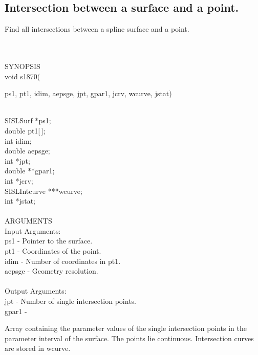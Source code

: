 \subsection{Intersection between a surface and a point.}
\begin{minipg1}
  Find all intersections between a spline surface and a point.
\end{minipg1} \\ \\
SYNOPSIS\\
        \>void s1870(\begin{minipg3}
        {\fov ps1}, {\fov pt1}, {\fov idim}, {\fov aepsge}, {\fov jpt}, {\fov gpar1}, {\fov jcrv}, {\fov wcurve}, {\fov jstat})
      \end{minipg3}\\[0.3ex]
      \>\>    SISLSurf    \>  *{\fov ps1};\\
      \>\>    double      \>  {\fov pt1}[\,];\\
      \>\>    int         \>  {\fov idim};\\
      \>\>    double      \>  {\fov aepsge};\\
      \>\>    int         \>  *{\fov jpt};\\
      \>\>    double      \>  **{\fov gpar1};\\
      \>\>    int         \>  *{\fov jcrv};\\
      \>\>    SISLIntcurve\>  ***{\fov wcurve};\\
      \>\>    int         \>  *{\fov jstat};\\
\\
ARGUMENTS\\
        \>Input Arguments:\\
        \>\>    {\fov ps1}    \> - \> Pointer to the surface.\\
        \>\>    {\fov pt1}    \> - \> Coordinates of the point.\\
        \>\>    {\fov idim}   \> - \> Number of coordinates in pt1.\\
        \>\>    {\fov aepsge} \> - \> Geometry resolution.\\
\\
        \>Output Arguments:\\
        \>\>    {\fov jpt}    \> - \> Number of single intersection points.\\
        \>\>    {\fov gpar1}  \> - \> \begin{minipg2}
                                        Array containing the parameter values of the
                                        single intersection points in the parameter
                                        interval of the surface. The points lie
                                        continuous. Intersection curves
                                        are stored in wcurve.
                                      \end{minipg2}\\[0.8ex]
